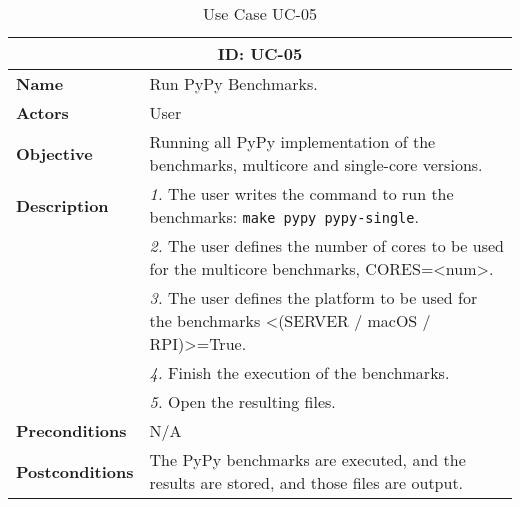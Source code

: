\begin{table}[H]
    \centering
    \begin{tabular}{l p{10cm}}
        \toprule
        \multicolumn{2}{c}{\textbf{ID: UC-05}} \\
        \toprule
        \textbf{Name}                         &  Run PyPy Benchmarks. \\
        \textbf{Actors}                       &  User \\
        \textbf{Objective}                    &  Running all PyPy implementation of the benchmarks, multicore and single-core versions. \\
        \multirow{1}{*}{\textbf{Description}} & \textsl{1.} The user writes the command to run the benchmarks: \texttt{make pypy pypy-single}.\\
                                              & \textsl{2.} The user defines the number of cores to be used for the multicore benchmarks, CORES=<num>.\\
                                              & \textsl{3.} The user defines the platform to be used for the benchmarks <(SERVER / macOS / RPI)>=True.\\
                                              & \textsl{4.} Finish the execution of the benchmarks.\\
                                              & \textsl{5.} Open the resulting files.\\
        \textbf{Preconditions}                &  N/A \\
        \textbf{Postconditions}               &  The PyPy benchmarks are executed, and the results are stored, and those files are output. \\
    \end{tabular}
    \caption{Use Case UC-05}
    \label{tab:uc-05}
\end{table}


